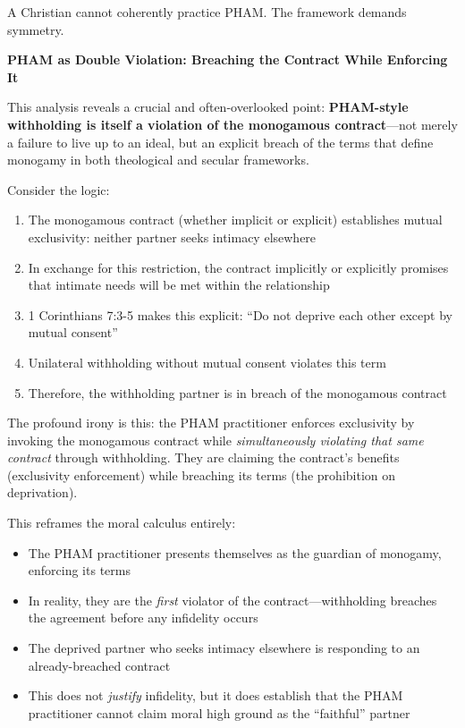 \documentclass[12pt,openany]{book}
\numberwithin{equation}{chapter}
\begin{document}
A Christian cannot coherently practice PHAM. The framework demands symmetry.

\textbf{PHAM as Double Violation: Breaching the Contract While Enforcing It}

This analysis reveals a crucial and often-overlooked point: \textbf{PHAM-style withholding is itself a violation of the monogamous contract}---not merely a failure to live up to an ideal, but an explicit breach of the terms that define monogamy in both theological and secular frameworks.

Consider the logic:
\begin{enumerate}
    \item The monogamous contract (whether implicit or explicit) establishes mutual exclusivity: neither partner seeks intimacy elsewhere
    \item In exchange for this restriction, the contract implicitly or explicitly promises that intimate needs will be met within the relationship
    \item 1 Corinthians 7:3-5 makes this explicit: ``Do not deprive each other except by mutual consent''
    \item Unilateral withholding without mutual consent violates this term
    \item Therefore, the withholding partner is in breach of the monogamous contract
\end{enumerate}

The profound irony is this: the PHAM practitioner enforces exclusivity by invoking the monogamous contract while \textit{simultaneously violating that same contract} through withholding. They are claiming the contract's benefits (exclusivity enforcement) while breaching its terms (the prohibition on deprivation).

This reframes the moral calculus entirely:
\begin{itemize}
    \item The PHAM practitioner presents themselves as the guardian of monogamy, enforcing its terms
    \item In reality, they are the \textit{first} violator of the contract---withholding breaches the agreement before any infidelity occurs
    \item The deprived partner who seeks intimacy elsewhere is responding to an already-breached contract
    \item This does not \textit{justify} infidelity, but it does establish that the PHAM practitioner cannot claim moral high ground as the ``faithful'' partner
\end{itemize}
\end{document}

